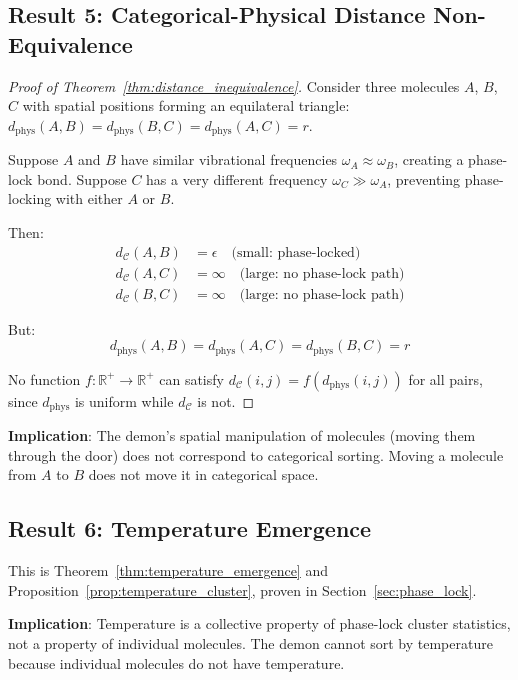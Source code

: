 \documentclass[twocolumn,showpacs,preprintnumbers,amsmath,amssymb,prd]{revtex4-2}
\theoremstyle{definition}
\theoremstyle{remark}
\newcommand{\catspace}{\mathcal{C}}
\begin{document}
\subsection{Result 5: Categorical-Physical Distance Non-Equivalence}

\begin{proof}[Proof of Theorem~\ref{thm:distance_inequivalence}]
Consider three molecules $A$, $B$, $C$ with spatial positions forming an equilateral triangle: $d_{\text{phys}}(A,B) = d_{\text{phys}}(B,C) = d_{\text{phys}}(A,C) = r$.

Suppose $A$ and $B$ have similar vibrational frequencies $\omega_A \approx \omega_B$, creating a phase-lock bond. Suppose $C$ has a very different frequency $\omega_C \gg \omega_A$, preventing phase-locking with either $A$ or $B$.

Then:
\begin{align}
d_{\catspace}(A, B) &= \epsilon \quad \text{(small: phase-locked)} \\
d_{\catspace}(A, C) &= \infty \quad \text{(large: no phase-lock path)} \\
d_{\catspace}(B, C) &= \infty \quad \text{(large: no phase-lock path)}
\end{align}

But:
\begin{equation}
d_{\text{phys}}(A, B) = d_{\text{phys}}(A, C) = d_{\text{phys}}(B, C) = r
\end{equation}

No function $f: \mathbb{R}^+ \to \mathbb{R}^+$ can satisfy $d_{\catspace}(i,j) = f(d_{\text{phys}}(i,j))$ for all pairs, since $d_{\text{phys}}$ is uniform while $d_{\catspace}$ is not.
\end{proof}

\textbf{Implication}: The demon's spatial manipulation of molecules (moving them through the door) does not correspond to categorical sorting. Moving a molecule from $A$ to $B$ does not move it in categorical space.

\subsection{Result 6: Temperature Emergence}

This is Theorem~\ref{thm:temperature_emergence} and Proposition~\ref{prop:temperature_cluster}, proven in Section~\ref{sec:phase_lock}.

\textbf{Implication}: Temperature is a collective property of phase-lock cluster statistics, not a property of individual molecules. The demon cannot sort by temperature because individual molecules do not have temperature.
\end{document}
